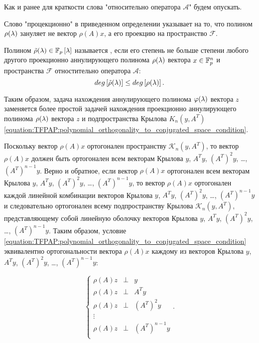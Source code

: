 Как и ранее для краткости слова "относительно оператора $\mathcal A$"{} будем опускать.
 
Слово "процекционно"{} в приведенном определении указывает на то, что полином $\rho (\lambda)$ зануляет не вектор $\rho(A)x$, а
его проекцию на пространство $\mathcal F$.

\begin{definition}
	Полином $\tilde\rho (\lambda) \in \mathbb{F}_p \left [ \lambda \right ]$ называется , если его степень не больше степени
	любого другого проекционно аннулирующего полинома $\rho (\lambda)$ вектора $x \in \mathbb{F}^{n}_p$ и пространства $\mathcal F$
	отностительно оператора $\mathcal A$:
		$$ deg \left [ \tilde\rho (\lambda) \right ] \le deg \left [ \rho (\lambda) \right ]. $$
\end{definition}

Таким образом, задача нахождения аннулирующего полинома $\varphi (\lambda)$ вектора $z$ заменяется более простой задачей
нахождения проекционно аннулирующего полинома $\rho (\lambda)$ вектора $z$ и подпространства Крылова $K_n(y, A^T)$
\eqref{equation:TFPAP:polynomial_orthogonality_to_conjugated_space_condition}.

Поскольку вектор $\rho(A) x$ ортогонален пространству $\mathcal K_n(y, A^T)$, то вектор $\rho(A) x$ должен быть ортогонален всем
векторам Крылова $y$, $A^T y$, $\left ( A^T \right ) ^2 y$, \dots, $\left ( A^T \right )^{n-1} y$. Верно и обратное, если вектор
$\rho(A) x$ ортогонален всем векторам Крылова $y$, $A^T y$, $\left ( A^T \right ) ^2 y$, \dots, $\left ( A^T \right )^{n-1} y$,
то вектор $\rho(A) x$ ортогонален каждой линейной комбинации векторов Крылова $y$, $A^T y$, $\left ( A^T \right ) ^2 y$, \dots,
$\left ( A^T \right )^{n-1} y$ и следовательно ортогонален всему подпространству Крылова $\mathcal K_n(y, A^T)$, представляющему собой
линейную оболочку векторов Крылова $y$, $A^T y$, $\left ( A^T \right ) ^2 y$, \dots, $\left ( A^T \right )^{n-1} y$. Таким образом,
условие \eqref{equation:TFPAP:polynomial_orthogonality_to_conjugated_space_condition} эквивалентно ортогональности вектора $\rho(A) x$ 
каждому из векторов Крылова $y$, $A^T y$, $\left ( A^T \right ) ^2 y$, \dots, $\left ( A^T \right )^{n-1} y$:

	$$
		\left \{
			\begin{array}{ccc}
				\rho(A) z & \perp & y \\
				\rho(A) z & \perp & A^T y \\
				\rho(A) z & \perp & \left ( A^T \right )^2 y \\
				\vdots \\
				\rho(A) z & \perp & \left ( A^T \right )^{n-1} y \\
			\end{array}
		\right .
		.
	$$

